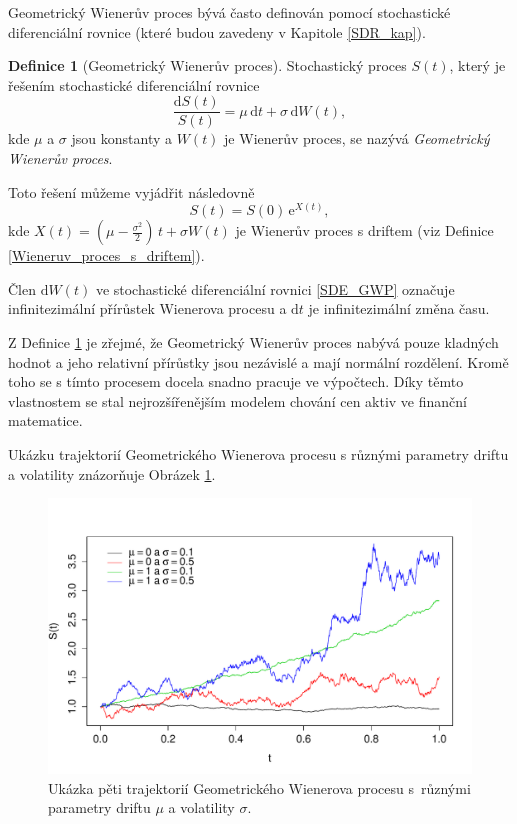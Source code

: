 \documentclass[a4paper,12pt]{report}
\theoremstyle{definition} \newtheorem{definice}[veta]{Definice}
\theoremstyle{remark}
\begin{document}
Geometrický Wienerův proces bývá často definován pomocí  stochastické diferenciální rovnice (které budou zavedeny v Kapitole \ref{SDR_kap}).
\begin{definice}[Geometrický Wienerův proces]\label{Geometricky_Wieneruv_proces}
Stochastický proces $S(t)$, který je řešením stochastické diferenciální rovnice 
\begin{equation}\label{SDE_GWP}
\frac{\mathrm{d} S(t)}{S(t)} = \mu\,\mathrm{d}t + \sigma\,\mathrm{d}W (t), 
\end{equation}
kde  $\mu$ a $\sigma$ jsou konstanty a $W (t)$ je Wienerův proces,
se nazývá \textit{Geometrický Wienerův proces}.

Toto řešení můžeme vyjádřit následovně
\begin{equation}\label{GWP}
S(t) = S(0)\,\mathrm{e}^{X(t)},
\end{equation}
kde $X(t) = (\mu - \frac{\sigma^2}{2})\,t + \sigma W (t)$ je Wienerův proces s driftem (viz Definice \ref{Wieneruv_proces_s_driftem}).
\end{definice}
Člen $\mathrm{d}W(t)$ ve stochastické diferenciální rovnici \eqref{SDE_GWP} označuje infinitezimální přírůstek Wienerova procesu a $\mathrm{d}t$ je infinitezimální změna času.

Z Definice \ref{Geometricky_Wieneruv_proces} je zřejmé, že Geometrický Wienerův proces nabývá pouze kladných hodnot a jeho relativní přírůstky jsou nezávislé a mají normální rozdělení. 
Kromě toho se s tímto procesem docela snadno pracuje ve výpočtech. 
Díky těmto vlastnostem se stal nejrozšířenějším modelem chování cen aktiv ve finanční matematice.

Ukázku trajektorií Geometrického Wienerova procesu s různými parametry driftu a volatility znázorňuje Obrázek \ref{GP_graf}.

\begin{figure}[!htbp]
  \centering 
	\includegraphics[width=13.5cm, clip, trim= 0 15 25 50]{IMG/GP_v2.pdf}
  \caption{Ukázka pěti trajektorií Geometrického Wienerova procesu s~různými parametry driftu $\mu$ a volatility $\sigma$.}  \label{GP_graf}
\end{figure}
\end{document}
